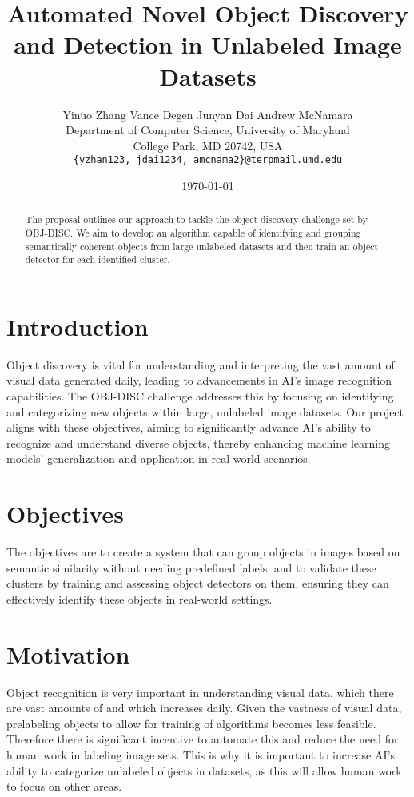 \documentclass{article}
\title{Automated Novel Object Discovery and Detection in Unlabeled Image Datasets}
\author{%
	Yinuo Zhang \AND Vance Degen \AND Junyan Dai \AND Andrew McNamara\\
	Department of Computer Science, University of Maryland\\
	College Park, MD 20742, USA\\
	\texttt{\{yzhan123, jdai1234, amcnama2\}@terpmail.umd.edu}}
\date{\today}
\begin{document}
	
	
	\maketitle
	
	
	\begin{abstract}
		The proposal outlines our approach to tackle the object discovery challenge set by OBJ-DISC. We aim to develop an algorithm capable of identifying and grouping semantically coherent objects from large unlabeled datasets and then train an object detector for each identified cluster.
	\end{abstract}
	
	
	\section{Introduction}
	
	
	Object discovery is vital for understanding and interpreting the vast amount of visual data generated daily, leading to advancements in AI's image recognition capabilities. The OBJ-DISC challenge addresses this by focusing on identifying and categorizing new objects within large, unlabeled image datasets. Our project aligns with these objectives, aiming to significantly advance AI's ability to recognize and understand diverse objects, thereby enhancing machine learning models' generalization and application in real-world scenarios.
	
	
	\section{Objectives}

	
	The objectives are to create a system that can group objects in images based on semantic similarity without needing predefined labels, and to validate these clusters by training and assessing object detectors on them, ensuring they can effectively identify these objects in real-world settings.
	
	 \section{Motivation}
	
    Object recognition is very important in understanding visual data, which there are vast amounts of and which increases daily. Given the vastness of visual data, prelabeling objects to allow for training of algorithms becomes less feasible. Therefore there is significant incentive to automate this and reduce the need for human work in labeling image sets. This is why it is important to increase AI's ability to categorize unlabeled objects in datasets, as this will allow human work to focus on other areas.
\end{document}
